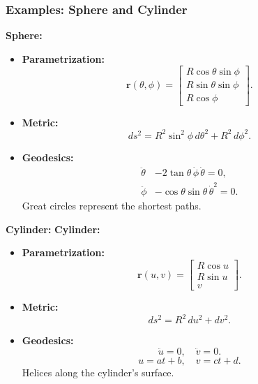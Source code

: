 \documentclass[12pt]{beamer}
\begin{document}
\begin{frame}
  \frametitle{Examples: Sphere and Cylinder}
  \textbf{Sphere:}
  \begin{itemize}
    \item \textbf{Parametrization:}
      \[
      \mathbf{r}(\theta,\phi)=\begin{bmatrix} R\cos\theta\sin\phi \\ R\sin\theta\sin\phi \\ R\cos\phi \end{bmatrix}.
      \]
    \item \textbf{Metric:}
      \[
      ds^2 = R^2\sin^2\phi\, d\theta^2 + R^2\,d\phi^2.
      \]
    \item \textbf{Geodesics:} 
    \[
    \begin{aligned}
        \ddot{\theta} &- 2\tan \theta\,\dot{\phi}\,\dot{\theta} = 0,\\
        \ddot{\phi} &- \cos \theta \sin \theta\,\dot{\theta}^2  = 0.
    \end{aligned}
    \]
    Great circles represent the shortest paths.
  \end{itemize}
\end{frame}

\begin{frame}
    \textbf{Cylinder:}
    \textbf{Cylinder:}
    \begin{itemize}
      \item \textbf{Parametrization:}
        \[
        \mathbf{r}(u,v)=\begin{bmatrix} R\cos u \\ R\sin u \\ v \end{bmatrix}.
        \]
      \item \textbf{Metric:}
        \[
        ds^2 = R^2\,du^2 + dv^2.
        \]
        \item \textbf{Geodesics:} 
        \[
            \ddot{u} = 0, \quad \ddot{v} = 0.
        \]
        \[
            u = at + b, \quad v = ct + d.
        \]
        Helices along the cylinder's surface.
    \end{itemize}
\end{frame}

\end{document}
